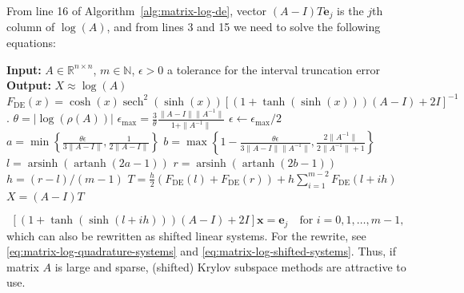 {From line 16 of Algorithm~\ref{alg:matrix-log-de}, vector $(A-I)T\boldsymbol{e}_j$ is the $j$th column of $\log(A)$, and from lines 3 and 15 we need to solve the following equations:}

\begin{algorithm}[H]\caption{{Computation of $\log(A)$ based on the DE formula}}\label{alg:matrix-log-de}\begin{algorithmic}[1]
\State \textbf{Input:} $A\in\mathbb{R}^{n\times n}$, $m\in\mathbb{N}$, {$\epsilon>0$ a tolerance for the interval truncation error}
\State \textbf{Output:} $X\approx\log(A)$
 $F_{\mathrm{DE}}(x)=\cosh(x)\operatorname{sech}^2(\sinh(x))[(1+\tanh(\sinh(x)))(A-I)+2I]^{-1}$.
\State $\theta=|\log(\rho(A))|$
\State $\epsilon_{\max}=\frac{3}{\theta}\frac{\|A-I\|\|A^{-1}\|}{1+\|A^{-1}\|}$
\If{$\epsilon\ge\epsilon_{\max}$}
\State $\epsilon\leftarrow\epsilon_{\max}/2$
\EndIf
\State $a=\min\left\{\frac{\theta\epsilon}{3\|A-I\|},\frac{1}{2\|A-I\|}\right\}$
\State $b=\max\left\{1-\frac{\theta\epsilon}{3\|A-I\|\|A^{-1}\|},\frac{2\|A^{-1}\|}{2\|A^{-1}\|+1}\right\}$
\State $l=\operatorname{arsinh}(\operatorname{artanh}(2a-1))$
\State $r=\operatorname{arsinh}(\operatorname{artanh}(2b-1))$
\State $h=(r-l)/(m-1)$
\State $T=\frac{h}{2}(F_{\mathrm{DE}}(l)+F_{\mathrm{DE}}(r))+h\sum_{i=1}^{m-2}F_{\mathrm{DE}}(l+ih)$
\State $X=(A-I)T$
\end{algorithmic}\end{algorithm}

\[[(1+\tanh(\sinh(l+ih)))(A-I)+2I]\boldsymbol{x}=\boldsymbol{e}_j\quad\text{for }i=0,1,\ldots,m-1,\]
{which can also be rewritten as shifted linear systems. For the rewrite, see \eqref{eq:matrix-log-quadrature-systems} and \eqref{eq:matrix-log-shifted-systems}. Thus, if matrix $A$ is large and sparse, (shifted) Krylov subspace methods are attractive to use.}
